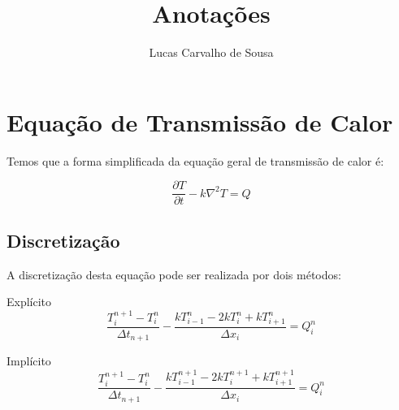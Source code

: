 \documentclass[a4paper]{article}
\title{Anotações}
\author{Lucas Carvalho de Sousa}
\begin{document}
\maketitle

\begin{abstract}

\end{abstract}
\newpage
\section{Equação de Transmissão de Calor}

Temos que a forma simplificada da equação geral de transmissão de calor é:

\begin{equation}
 \frac{\partial T}{\partial t}-k\nabla^2 T=Q
\end{equation}

\subsection{Discretização}

A discretização desta equação pode ser realizada por dois métodos:
\begin{list}{Método}{}
 \item[] Explícito
 \begin{equation}
  \dfrac{T^{n+1}_i-T^{n}_i}{\Delta t_{n+1}} - \dfrac{k T^{n}_{i-1}-2k T^{n}_i+k T^{n}_{i+1}}{\Delta x_i} = Q^{n}_i 
 \end{equation}
 \item[] Implícito
 \begin{equation}
  \dfrac{T^{n+1}_i-T^{n}_i}{\Delta t_{n+1}} - \dfrac{k T^{n+1}_{i-1}-2k T^{n+1}_i+k T^{n+1}_{i+1}}{\Delta x_i} = Q^{n}_i
 \end{equation}
\end{list}

\FloatBarrier
% 
\end{document}
